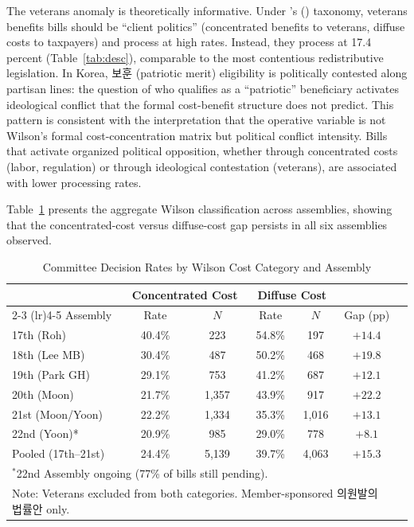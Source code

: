 \documentclass[11pt]{article}
\begin{document}
The veterans anomaly is theoretically informative. Under \citeauthor{wilson1980}'s (\citeyear{wilson1980}) taxonomy, veterans benefits bills should be ``client politics'' (concentrated benefits to veterans, diffuse costs to taxpayers) and process at high rates. Instead, they process at 17.4 percent (Table~\ref{tab:desc}), comparable to the most contentious redistributive legislation. In Korea, 보훈 (patriotic merit) eligibility is politically contested along partisan lines: the question of who qualifies as a ``patriotic'' beneficiary activates ideological conflict that the formal cost-benefit structure does not predict. This pattern is consistent with the interpretation that the operative variable is not Wilson's formal cost-concentration matrix but political conflict intensity. Bills that activate organized political opposition, whether through concentrated costs (labor, regulation) or through ideological contestation (veterans), are associated with lower processing rates.

Table~\ref{tab:cross_assembly} presents the aggregate Wilson classification across assemblies, showing that the concentrated-cost versus diffuse-cost gap persists in all six assemblies observed.

\begin{table}[H]
\centering
\caption{Committee Decision Rates by Wilson Cost Category and Assembly}
\label{tab:cross_assembly}
\begin{tabular}{lcccccc}
\toprule
 & \multicolumn{2}{c}{Concentrated Cost} & \multicolumn{2}{c}{Diffuse Cost} & \\
\cmidrule(lr){2-3} \cmidrule(lr){4-5}
Assembly & Rate & $N$ & Rate & $N$ & Gap (pp) \\
\midrule
17th (Roh)          & 40.4\% & 223   & 54.8\% & 197   & $+14.4$ \\
18th (Lee MB)       & 30.4\% & 487   & 50.2\% & 468   & $+19.8$ \\
19th (Park GH)      & 29.1\% & 753   & 41.2\% & 687   & $+12.1$ \\
20th (Moon)         & 21.7\% & 1,357 & 43.9\% & 917   & $+22.2$ \\
21st (Moon/Yoon)    & 22.2\% & 1,334 & 35.3\% & 1,016 & $+13.1$ \\
22nd (Yoon)*        & 20.9\% & 985   & 29.0\% & 778   & $+8.1$ \\
\midrule
Pooled (17th--21st) & 24.4\% & 5,139 & 39.7\% & 4,063 & $+15.3$ \\
\bottomrule
\multicolumn{6}{l}{\footnotesize $^{*}$22nd Assembly ongoing (77\% of bills still pending).} \\
\multicolumn{6}{l}{\footnotesize Note: Veterans excluded from both categories. Member-sponsored 의원발의 법률안 only.} \\
\end{tabular}
\end{table}
\end{document}
